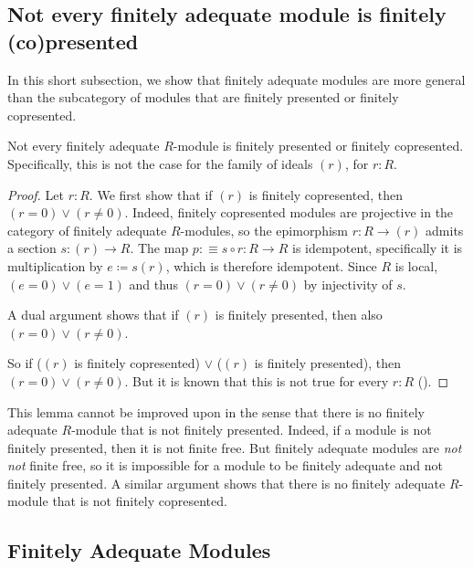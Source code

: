\subsection{Not every finitely adequate module is finitely (co)presented}\label{ss:ex-fin-pres-fin-copres}

In this short subsection, we show that finitely adequate modules are more
general than the subcategory of modules that are finitely presented or
finitely copresented.

\begin{lemma}\label{lem:finitely-adequate-not-fp}
  Not every finitely adequate $R$-module is finitely presented or finitely copresented.
  Specifically, this is not the case for the family of ideals $(r)$, for $r:R$.
\end{lemma}

\begin{proof}
  Let $r : R$.
  We first show that if $(r)$ is finitely copresented, then $(r=0) \lor (r \neq 0)$.
  Indeed, finitely copresented modules are projective in the category of finitely adequate $R$-modules, so the epimorphism $r : R \to (r)$ admits a section $s : (r) \to R$.
  The map $p :\equiv s \circ r :R \to R$ is idempotent, specifically it is multiplication by $e\coloneq s(r)$, which is therefore idempotent.
  Since $R$ is local, $(e=0) \lor (e=1)$ and thus $(r=0) \lor (r \neq 0)$ by injectivity of \(s\).

  A dual argument shows that if $(r)$ is finitely presented, then also $(r=0) \lor (r \neq 0)$.

  So if ($(r)$ is finitely copresented) $\lor$ ($(r)$ is finitely presented), then
  $(r=0) \lor (r \neq 0)$.
  But it is known that this is not true for every $r : R$ (\cite[Corollary~1.2.4]{topology-draft}).
\end{proof}

\begin{remark}\label{rem:finitely-adequate-fp}
  This lemma cannot be improved upon in the sense that there is no finitely adequate $R$-module that is not finitely presented.
  Indeed, if a module is not finitely presented, then it is not finite free.
  But finitely adequate modules are \emph{not not} finite free, so it is
  impossible for a module to be finitely adequate and not finitely presented.
  A similar argument shows that there is no finitely adequate $R$-module that is not finitely copresented.
\end{remark}


\subsection{Finitely Adequate Modules}\label{ss:ex-strange}

